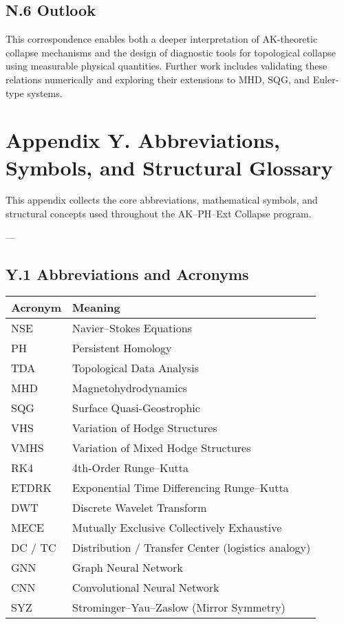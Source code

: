 \documentclass[11pt]{article}
\theoremstyle{definition}
\begin{document}
\subsection*{N.6 Outlook}

This correspondence enables both a deeper interpretation of AK-theoretic collapse mechanisms and the design of diagnostic tools for topological collapse using measurable physical quantities.  
Further work includes validating these relations numerically and exploring their extensions to MHD, SQG, and Euler-type systems.


\section*{Appendix Y. Abbreviations, Symbols, and Structural Glossary}

This appendix collects the core abbreviations, mathematical symbols, and structural concepts used throughout the AK–PH–Ext Collapse program.

---

\subsection*{Y.1 Abbreviations and Acronyms}

\begin{tabular}{ll}
\textbf{Acronym} & \textbf{Meaning} \\
\hline
NSE & Navier–Stokes Equations \\
PH & Persistent Homology \\
TDA & Topological Data Analysis \\
MHD & Magnetohydrodynamics \\
SQG & Surface Quasi-Geostrophic \\
VHS & Variation of Hodge Structures \\
VMHS & Variation of Mixed Hodge Structures \\
RK4 & 4th-Order Runge–Kutta \\
ETDRK & Exponential Time Differencing Runge–Kutta \\
DWT & Discrete Wavelet Transform \\
MECE & Mutually Exclusive Collectively Exhaustive \\
DC / TC & Distribution / Transfer Center (logistics analogy) \\
GNN & Graph Neural Network \\
CNN & Convolutional Neural Network \\
SYZ & Strominger–Yau–Zaslow (Mirror Symmetry) \\
\end{tabular}
\end{document}
